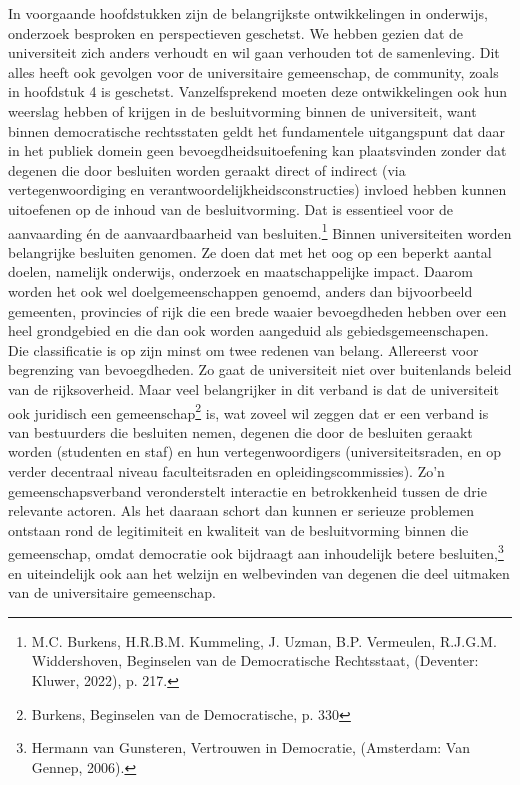 \documentclass[empirical, authordate, ]{new-jote-article}
\begin{document}
	In voorgaande hoofdstukken zijn de belangrijkste ontwikkelingen in onderwijs, onderzoek besproken en perspectieven geschetst. We hebben gezien dat de universiteit zich anders verhoudt en wil gaan verhouden tot de samenleving. Dit alles heeft ook gevolgen voor de universitaire gemeenschap, de community, zoals in hoofdstuk 4 is geschetst. Vanzelfsprekend moeten deze ontwikkelingen ook hun weerslag hebben of krijgen in de besluitvorming binnen de universiteit, want binnen democratische rechtsstaten geldt het fundamentele uitgangspunt dat daar in het publiek domein geen bevoegdheidsuitoefening kan plaatsvinden zonder dat degenen die door besluiten worden geraakt direct of indirect (via vertegenwoordiging en verantwoordelijkheidsconstructies) invloed hebben kunnen uitoefenen op de inhoud van de besluitvorming. Dat is essentieel voor de aanvaarding én de aanvaardbaarheid van besluiten.\footnote{M.C. Burkens, H.R.B.M. Kummeling, J. Uzman, B.P. Vermeulen, R.J.G.M. Widdershoven, Beginselen van de Democratische Rechtsstaat, (Deventer: Kluwer, 2022), p. 217.} Binnen universiteiten worden belangrijke besluiten genomen. Ze doen dat met het oog op een beperkt aantal doelen, namelijk onderwijs, onderzoek en maatschappelijke impact. Daarom worden het ook wel doelgemeenschappen genoemd, anders dan bijvoorbeeld gemeenten, provincies of rijk die een brede waaier bevoegdheden hebben over een heel grondgebied en die dan ook worden aangeduid als gebiedsgemeenschapen. Die classificatie is op zijn minst om twee redenen van belang. Allereerst voor begrenzing van bevoegdheden. Zo gaat de universiteit niet over buitenlands beleid van de rijksoverheid. Maar veel belangrijker in dit verband is dat de universiteit ook juridisch een gemeenschap\footnote{Burkens, Beginselen van de Democratische, p. 330} is, wat zoveel wil zeggen dat er een verband is van bestuurders die besluiten nemen, degenen die door de besluiten geraakt worden (studenten en staf) en hun vertegenwoordigers (universiteitsraden, en op verder decentraal niveau faculteitsraden en opleidingscommissies). Zo'n gemeenschapsverband veronderstelt interactie en betrokkenheid tussen de drie relevante actoren. Als het daaraan schort dan kunnen er serieuze problemen ontstaan rond de legitimiteit en kwaliteit van de besluitvorming binnen die gemeenschap, omdat democratie ook bijdraagt aan inhoudelijk betere besluiten,\footnote{Hermann van Gunsteren, Vertrouwen in Democratie, (Amsterdam: Van Gennep, 2006).} en uiteindelijk ook aan het welzijn en welbevinden van degenen die deel uitmaken van de universitaire gemeenschap.
\end{document}
